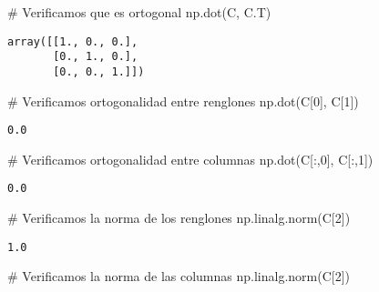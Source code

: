 \documentclass[
  letterpaper,
  DIV=11,
  numbers=noendperiod]{scrreprt}
\newenvironment{Shaded}{\begin{snugshade}}{\end{snugshade}}
\newcommand{\CommentTok}[1]{\textcolor[rgb]{0.37,0.37,0.37}{#1}}
\newcommand{\DecValTok}[1]{\textcolor[rgb]{0.68,0.00,0.00}{#1}}
\newcommand{\NormalTok}[1]{\textcolor[rgb]{0.00,0.23,0.31}{#1}}
\begin{document}
\begin{Shaded}
\begin{Highlighting}[]
\CommentTok{\# Verificamos que es ortogonal}
\NormalTok{np.dot(C, C.T)}
\end{Highlighting}
\end{Shaded}

\begin{verbatim}
array([[1., 0., 0.],
       [0., 1., 0.],
       [0., 0., 1.]])
\end{verbatim}

\begin{Shaded}
\begin{Highlighting}[]
\CommentTok{\# Verificamos ortogonalidad entre renglones}
\NormalTok{np.dot(C[}\DecValTok{0}\NormalTok{], C[}\DecValTok{1}\NormalTok{])}
\end{Highlighting}
\end{Shaded}

\begin{verbatim}
0.0
\end{verbatim}

\begin{Shaded}
\begin{Highlighting}[]
\CommentTok{\# Verificamos ortogonalidad entre columnas}
\NormalTok{np.dot(C[:,}\DecValTok{0}\NormalTok{], C[:,}\DecValTok{1}\NormalTok{])}
\end{Highlighting}
\end{Shaded}

\begin{verbatim}
0.0
\end{verbatim}

\begin{Shaded}
\begin{Highlighting}[]
\CommentTok{\# Verificamos la norma de los renglones}
\NormalTok{np.linalg.norm(C[}\DecValTok{2}\NormalTok{])}
\end{Highlighting}
\end{Shaded}

\begin{verbatim}
1.0
\end{verbatim}

\begin{Shaded}
\begin{Highlighting}[]
\CommentTok{\# Verificamos la norma de las columnas}
\NormalTok{np.linalg.norm(C[}\DecValTok{2}\NormalTok{])}
\end{Highlighting}
\end{Shaded}
\end{document}
